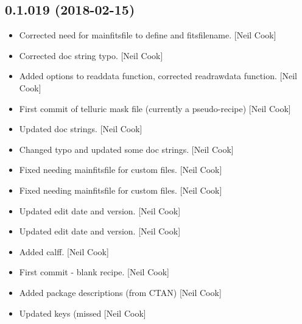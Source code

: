 \documentclass[a4paper,10pt,english]{report}
\begin{document}
\subsection{0.1.019 (2018-02-15)}
\label{\detokenize{misc/changelog:id485}}\begin{itemize}
\item {} 
Corrected need for mainfitsfile to define  and
fitsfilename. {[}Neil Cook{]}

\item {} 
Corrected doc string typo. {[}Neil Cook{]}

\item {} 
Added  options to readdata function,
corrected readrawdata function. {[}Neil Cook{]}

\item {} 
First commit of telluric mask file (currently a pseudo-recipe) {[}Neil
Cook{]}

\item {} 
Updated doc strings. {[}Neil Cook{]}

\item {} 
Changed typo and updated some doc strings. {[}Neil Cook{]}

\item {} 
Fixed needing mainfitsfile for custom files. {[}Neil Cook{]}

\item {} 
Fixed needing mainfitsfile for custom files. {[}Neil Cook{]}

\item {} 
Updated edit date and version. {[}Neil Cook{]}

\item {} 
Updated edit date and version. {[}Neil Cook{]}

\item {} 
Added calff. {[}Neil Cook{]}

\item {} 
First commit - blank  recipe. {[}Neil Cook{]}

\item {} 
Added package descriptions (from CTAN) {[}Neil Cook{]}

\item {} 
Updated keys (missed  {[}Neil Cook{]}

\end{itemize}
\end{document}
